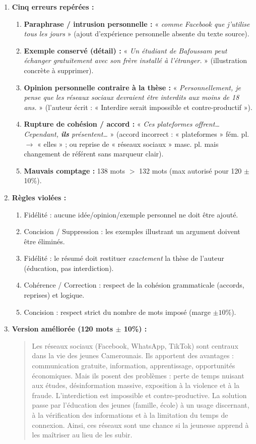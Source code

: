 \documentclass[11pt]{article}
\newcommand{\cle}[1]{{\popxbold\color{popdark}#1}}
\begin{document}
\begin{corrige}
\begin{enumerate}
\item \textbf{Cinq erreurs repérées :}
\begin{enumerate}
\item \textbf{Paraphrase / intrusion personnelle :} « \emph{comme Facebook que j'utilise tous les jours} » (ajout d'expérience personnelle absente du texte source).
\item \textbf{Exemple conservé (détail) :} « \emph{Un étudiant de Bafoussam peut échanger gratuitement avec son frère installé à l'étranger.} » (illustration concrète à supprimer).
\item \textbf{Opinion personnelle contraire à la thèse :} « \emph{Personnellement, je pense que les réseaux sociaux devraient être interdits aux moins de 18 ans.} » (l'auteur écrit : « Interdire serait impossible et contre-productif »).
\item \textbf{Rupture de cohésion / accord :} « \emph{Ces plateformes offrent… Cependant, \textbf{ils} présentent…} » (accord incorrect : « plateformes » fém. pl. $\rightarrow$ « elles » ; ou reprise de « réseaux sociaux » masc. pl. mais changement de référent sans marqueur clair).
\item \textbf{Mauvais comptage :} 138 mots $>$ 132 mots (max autorisé pour 120 $\pm$ 10\%).
\end{enumerate}
\item \textbf{Règles violées :}
\begin{enumerate}
\item \cle{Fidélité} : aucune idée/opinion/exemple personnel ne doit être ajouté.
\item \cle{Concision} / \cle{Suppression} : les exemples illustrant un argument doivent être éliminés.
\item \cle{Fidélité} : le résumé doit restituer \emph{exactement} la thèse de l'auteur (éducation, pas interdiction).
\item \cle{Cohérence} / \cle{Correction} : respect de la cohésion grammaticale (accords, reprises) et logique.
\item \cle{Concision} : respect strict du nombre de mots imposé (marge $\pm 10\%$).
\end{enumerate}
\item \textbf{Version améliorée (120 mots $\pm$ 10\%) :}
\begin{quote}
Les réseaux sociaux (Facebook, WhatsApp, TikTok) sont centraux dans la vie des jeunes Camerounais. Ils apportent des avantages : communication gratuite, information, apprentissage, opportunités économiques. Mais ils posent des problèmes : perte de temps nuisant aux études, désinformation massive, exposition à la violence et à la fraude. L'interdiction est impossible et contre-productive. La solution passe par l'éducation des jeunes (famille, école) à un usage discernant, à la vérification des informations et à la limitation du temps de connexion. Ainsi, ces réseaux sont une chance si la jeunesse apprend à les maîtriser au lieu de les subir.

\end{quote}
\end{enumerate}
\end{corrige}
\end{document}
